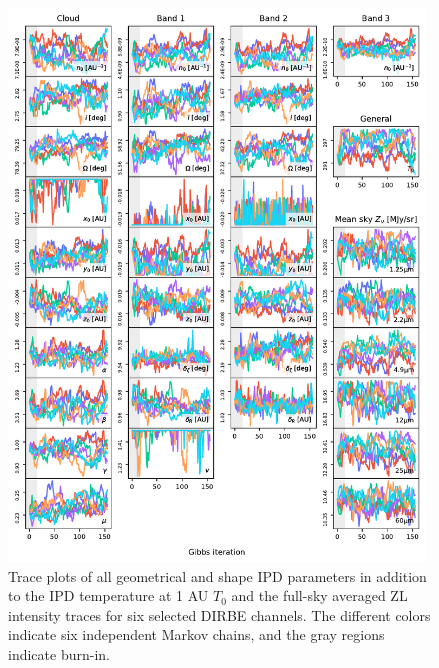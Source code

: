 \documentclass[twocolumn]{aa}
\begin{document}
\begin{figure}
    \centering
    \includegraphics[width=0.985\textwidth]{figs/total_trace_final.pdf}
    \caption{Trace plots of all geometrical and shape IPD parameters in addition to the IPD temperature at 1 AU $T_0$ and the full-sky averaged ZL intensity traces for six selected DIRBE channels. The different colors indicate six independent Markov chains, and the gray regions indicate burn-in.}
    \label{fig:trace-ipd}
\end{figure}
\end{document}
